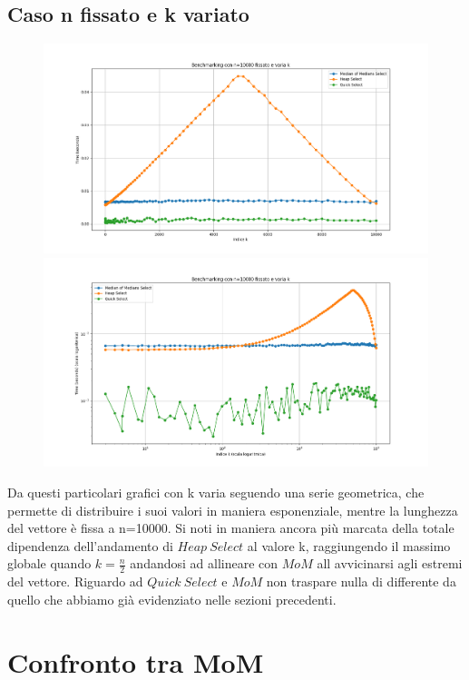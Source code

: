 \documentclass[a4paper]{article}
\begin{document}
\subsection{Caso n fissato e k variato}
\begin{figure}[h]
    \centering
    \includegraphics[width=.83\textwidth]{graphs/n_fisso/np.png}
    \includegraphics[width=.83\textwidth]{graphs/n_fisso/np2.png}
\end{figure}
Da questi particolari grafici con k varia seguendo una serie geometrica, che permette di distribuire i suoi valori in maniera esponenziale, mentre la lunghezza del vettore è fissa a n=10000. Si noti in maniera ancora più marcata della totale dipendenza dell'andamento di $Heap\ Select$ al valore k, raggiungendo il massimo globale quando $k=\frac{n}{2}$ andandosi ad allineare con $MoM$ all avvicinarsi agli estremi del vettore. Riguardo ad $Quick\ Select$ e $MoM$ non traspare nulla di differente da quello che abbiamo già evidenziato nelle sezioni precedenti.\\
\newpage
\section{Confronto tra MoM}
\end{document}
